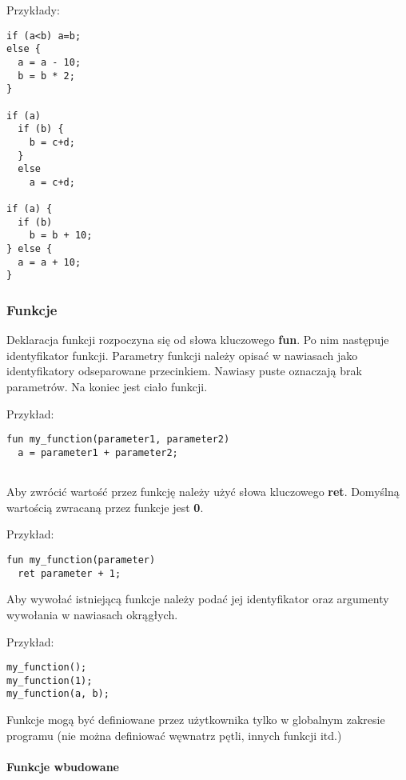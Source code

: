 \documentclass[12pt,a4paper]{article}
\begin{document}
Przykłady:
\lstset{language=Python}
\begin{lstlisting}
if (a<b) a=b;
else {
  a = a - 10;
  b = b * 2;
}

if (a)
  if (b) {
    b = c+d;
  }
  else
    a = c+d;
    
if (a) {
  if (b)
    b = b + 10;
} else { 
  a = a + 10;
}

\end{lstlisting}

\subsubsection{Funkcje}

Deklaracja funkcji rozpoczyna się od słowa kluczowego \textbf{fun}.
Po nim następuje identyfikator funkcji. Parametry funkcji należy opisać w nawiasach jako identyfikatory odseparowane przecinkiem. Nawiasy puste oznaczają brak parametrów. Na koniec jest ciało funkcji.

\medskip

Przykład:

\begin{lstlisting}
fun my_function(parameter1, parameter2)
  a = parameter1 + parameter2;
  
\end{lstlisting}

Aby zwrócić wartość przez funkcję należy użyć słowa kluczowego \textbf{ret}. Domyślną wartością zwracaną przez funkcje jest \textbf{0}.

\medskip
Przykład:

\begin{lstlisting}
fun my_function(parameter)
  ret parameter + 1;

\end{lstlisting}

Aby wywołać istniejącą funkcje należy podać jej identyfikator oraz argumenty wywołania w nawiasach okrągłych.

\medskip
Przykład:

\begin{lstlisting}
my_function();
my_function(1);
my_function(a, b);
\end{lstlisting}

Funkcje mogą być definiowane przez użytkownika tylko w globalnym zakresie programu (nie można definiować węwnatrz pętli, innych funkcji itd.)

\paragraph{Funkcje wbudowane}
\end{document}
